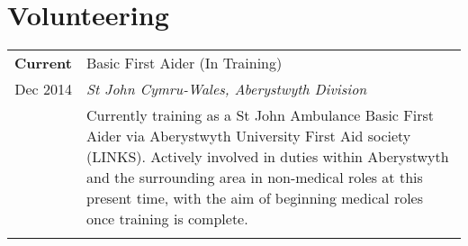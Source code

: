 \documentclass[a4paper, 10pt]{extarticle} %
\begin{document}
\section{Volunteering}

\begin{tabular}{r | p{13cm}}	

\textbf{Current}
		
		 & 
		 
		 Basic First Aider (In Training)  \\
		 
			Dec 2014
		 
		& 
		 
		\textit{St John Cymru-Wales, Aberystwyth Division} \\ 
		
& 

\footnotesize{

Currently training as a St John Ambulance Basic First Aider via Aberystwyth University First Aid society (LINKS). Actively involved in duties within Aberystwyth and the surrounding area in non-medical roles at this present time, with the aim of beginning medical roles once training is complete. 

\vspace{-0.4cm}

} \vspace{-0.4cm} \\

\multicolumn{2}{c}{} \\

\end{tabular}



%
%
\end{document}
